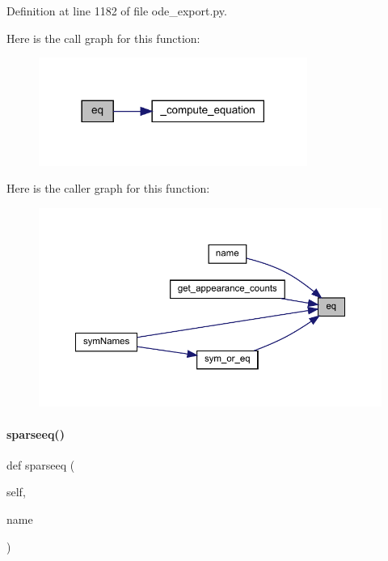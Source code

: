 Definition at line 1182 of file ode\+\_\+export.\+py.

Here is the call graph for this function\+:
\nopagebreak
\begin{figure}[H]
\begin{center}
\leavevmode
\includegraphics[width=249pt]{classamici_1_1ode__export_1_1_o_d_e_model_addafc9d839b53dbe76461d8ac6dba604_cgraph}
\end{center}
\end{figure}
Here is the caller graph for this function\+:
\nopagebreak
\begin{figure}[H]
\begin{center}
\leavevmode
\includegraphics[width=350pt]{classamici_1_1ode__export_1_1_o_d_e_model_addafc9d839b53dbe76461d8ac6dba604_icgraph}
\end{center}
\end{figure}
\mbox{\label{classamici_1_1ode__export_1_1_o_d_e_model_ade69c458d3c7069f0b062d796f68d1da}} 
\paragraph{\texorpdfstring{sparseeq()}{sparseeq()}}
{\footnotesize\ttfamily def sparseeq (\begin{DoxyParamCaption}\item[{}]{self,  }\item[{}]{name }\end{DoxyParamCaption})}



